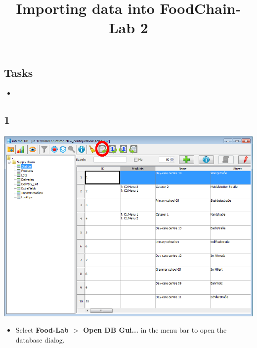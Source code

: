 \documentclass{beamer}
\title{Importing data into FoodChain-Lab 2}
\date{}
\begin{document}
\maketitle

\section{ }

\subsection{Tasks}
\begin{frame}
	\begin{itemize}
		\item
	\end{itemize}
\end{frame}
 
\subsection{1}
\begin{frame}
	\begin{center}
  		\includegraphics[height=0.6\textheight]{1.png}
	\end{center}
	\begin{itemize}
		\item Select \textbf{Food-Lab $>$ Open DB Gui...} in the menu bar to open the database dialog.
	\end{itemize}
\end{frame}
\end{document}
